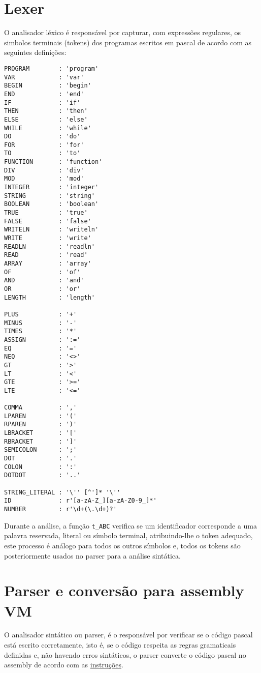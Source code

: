 \documentclass[12pt,a4paper]{report}%
\begin{document}
\section{Lexer}
O analisador léxico é responsável por capturar, com expressões regulares, os simbolos terminais (tokens) dos programas escritos em pascal de acordo com as seguintes definições:
\begin{verbatim}
PROGRAM        : 'program'
VAR            : 'var'
BEGIN          : 'begin'
END            : 'end'
IF             : 'if'
THEN           : 'then'
ELSE           : 'else'
WHILE          : 'while'
DO             : 'do'
FOR            : 'for'
TO             : 'to'
FUNCTION       : 'function'
DIV            : 'div'
MOD            : 'mod'
INTEGER        : 'integer'
STRING         : 'string'
BOOLEAN        : 'boolean'
TRUE           : 'true'
FALSE          : 'false'
WRITELN        : 'writeln'
WRITE          : 'write'
READLN         : 'readln'
READ           : 'read'
ARRAY          : 'array'
OF             : 'of'
AND            : 'and'
OR             : 'or'
LENGTH         : 'length'

PLUS           : '+'
MINUS          : '-'
TIMES          : '*'
ASSIGN         : ':='
EQ             : '='
NEQ            : '<>'
GT             : '>'
LT             : '<'
GTE            : '>='
LTE            : '<='

COMMA          : ','
LPAREN         : '('
RPAREN         : ')'
LBRACKET       : '['
RBRACKET       : ']'
SEMICOLON      : ';'
DOT            : '.'
COLON          : ':'
DOTDOT         : '..'

STRING_LITERAL : '\'' [^']* '\''
ID             : r'[a-zA-Z_][a-zA-Z0-9_]*'
NUMBER         : r'\d+(\.\d+)?'
\end{verbatim}
Durante a análise, a função \texttt{t\_ABC} verifica se um identificador corresponde a uma palavra reservada, literal ou símbolo terminal, atribuindo-lhe o token adequado, este processo é análogo para todos os outros símbolos e, todos os tokens são posteriormente usados no parser para a análise sintática.

\newpage
\section{Parser e conversão para assembly VM}

O analisador sintático ou parser,  é o responsável por verificar se o código pascal está escrito corretamente, isto é, se o código respeita as regras gramaticais definidas e, não havendo erros sintáticos, o parser converte o código pascal no assembly de acordo com as \href{https://ewvm.epl.di.uminho.pt/manual}{instruções}.
\end{document}
